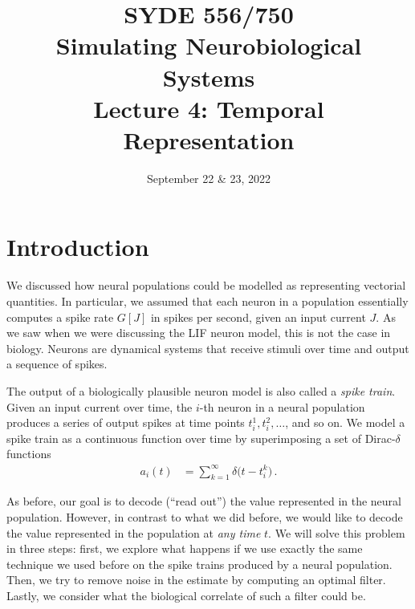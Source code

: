 \documentclass[10pt,letterpaper,oneside]{article}
\date{September 22 \& 23, 2022}
\title{SYDE 556/750 \\ Simulating Neurobiological Systems \\ Lecture 4: Temporal Representation}
\begin{document}

\section{Introduction}


We discussed how neural populations could be modelled as representing vectorial quantities. In particular, we assumed that each neuron in a population essentially computes a spike rate $G[J]$ in spikes per second, given an input current $J$. As we saw when we were discussing the LIF neuron model, this is not the case in biology. Neurons are dynamical systems that receive stimuli over time and output a sequence of spikes.

The output of a biologically plausible neuron model is also called a \emph{spike train}. Given an input current over time, the $i$-th neuron in a neural population produces a series of output spikes at time points $t^1_i, t^2_i, \ldots$, and so on. We model a spike train as a continuous function over time by superimposing a set of Dirac-$\delta$ functions
\begin{align*}
	a_i(t) &= \sum_{k = 1}^\infty \delta\big(t - t^k_i\big) \,.
\end{align*}


As before, our goal is to decode (\enquote{read out}) the value represented in the neural population. However, in contrast to what we did before, we would like to decode the value represented in the population at \emph{any time} $t$. We will solve this problem in three steps: first, we explore what happens if we use exactly the same technique we used before on the spike trains produced by a neural population. Then, we try to remove noise in the estimate by computing an optimal filter. Lastly, we consider what the biological correlate of such a filter could be.
\end{document}
